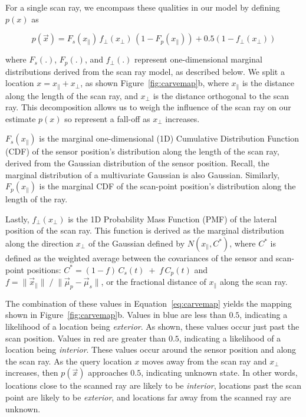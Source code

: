 \documentclass[12pt,onecolumn,oneside]{book}
\begin{document}
For a single scan ray, we encompass these qualities in our model by defining $p(x)$ as

\begin{equation}
	p(\vec{x}) = F_s(x_{\parallel}) \, f_{\perp}(x_{\perp}) \, (1 - F_p(x_{\parallel})) + 0.5 (1 - f_{\perp}(x_{\perp}))
	\label{eq:carvemap}
\end{equation}

\noindent where $F_s(.)$, $F_p(.)$, and $f_{\perp}(.)$ represent one-dimensional marginal distributions derived from the scan ray model, as described below.  We split a location $x = x_{\parallel} + x_{\perp}$, as shown Figure~\ref{fig:carvemap}b, where $x_{\parallel}$ is the distance along the length of the scan ray, and $x_{\perp}$ is the distance orthogonal to the scan ray.  This decomposition allows us to weigh the influence of the scan ray on our estimate $p(x)$ so represent a fall-off as $x_{\perp}$ increases.

$F_s(x_{\parallel})$ is the marginal one-dimensional (1D) Cumulative Distribution Function (CDF) of the sensor position's distribution along the length of the scan ray, derived from the Gaussian distribution of the sensor position.  Recall, the marginal distribution of a multivariate Gaussian is also Gaussian.  Similarly, $F_p(x_{\parallel})$ is the marginal CDF of the scan-point position's distribution along the length of the ray. 

Lastly, $f_{\perp}(x_{\perp})$ is the 1D Probability Mass Function (PMF) of the lateral position of the scan ray.  This function is derived as the marginal distribution along the direction $x_{\perp}$ of the Gaussian defined by $N(x_{\parallel}, C^*)$, where $C^*$ is defined as the weighted average between the covariances of the sensor and scan-point positions:  $C^* = ( 1-f ) \,  C_s(t) \; + \; f \, C_p(t)$ and $f = \| \vec{x}_{\parallel} \| \; / \; \| \vec{\mu}_p - \vec{\mu}_s \|$, or the fractional distance of $x_{\parallel}$ along the scan ray.

The combination of these values in Equation~\ref{eq:carvemap} yields the mapping shown in Figure~\ref{fig:carvemap}b.  Values in blue are less than $0.5$, indicating a likelihood of a location being {\it exterior}.  As shown, these values occur just past the scan position.  Values in red are greater than $0.5$, indicating a likelihood of a location being {\it interior}.  These values occur around the sensor position and along the scan ray.  As the query location $x$ moves away from the scan ray and $x_{\perp}$ increases, then $p(\vec{x})$ approaches $0.5$, indicating unknown state.  In other words, locations close to the scanned ray are likely to be {\it interior}, locations past the scan point are likely to be {\it exterior}, and locations far away from the scanned ray are unknown.
\end{document}
